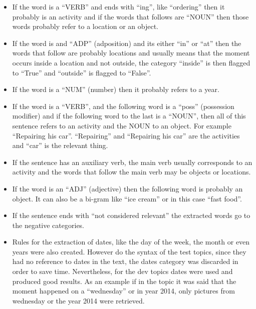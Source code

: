   \begin{itemize}
    
      \item  If the word is a \enquote{VERB} and ends with \enquote{ing}, like \enquote{ordering} then it probably is an activity and if the words that follows are \enquote{NOUN} then those words probably refer to a location or an object. 
      
      
      \item  If the word is and \enquote{ADP} (adposition) and its either \enquote{in} or \enquote{at} then the words that follow are probably locations and usually means that the moment occurs inside a location and not outside, the category \enquote{inside} is then flagged to \enquote{True} and \enquote{outside} is flagged to \enquote{False}.
      
      \item If the word is a \enquote{NUM} (number) then it probably refers to a year.
      
      \item If the word is a \enquote{VERB}, and the following word is a \enquote{poss} (possession modifier) and if the following word to the last is a \enquote{NOUN}, then all of this sentence refers to an activity and the NOUN to an object. For example \enquote{Repairing his car}. \enquote{Repairing} and \enquote{Repairing his car} are the activities and \enquote{car} is the relevant thing.
      
      \item If the sentence has an auxiliary verb, the main verb usually corresponds to an activity and the words that follow the main verb may be objects or locations.
      
      \item If the word is an \enquote{ADJ} (adjective) then the following word is probably an object. It can also be a bi-gram like \enquote{ice cream} or in this case \enquote{fast food}.
      
      \item If the sentence ends with \enquote{not considered relevant} the extracted words go to the negative categories.
      
      \item Rules for the extraction of dates, like the day of the week, the month or even years were also created. However do the syntax of the test topics, since they had no reference to dates in the text, the dates category was discarded in order to save time. Nevertheless, for the dev topics dates were used and produced good results. As an example if in the topic it was said that the moment happened on a \enquote{wednesday} or in year 2014, only pictures from wednesday or the year 2014 were retrieved.

    \end{itemize}
      
